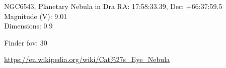 \begin{block}{NGC6543, Planetary Nebula in Dra}
    RA: 17:58:33.39, Dec: +66:37:59.5 \\ 
    Magnitude (V): 9.01 \\ 
    Dimensions: 0.9 

    Finder fov: 30 

    \url{https://en.wikipedia.org/wiki/Cat%27s_Eye_Nebula} 
\end{block}